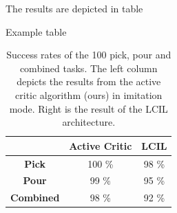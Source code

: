 The results are depicted in table

\begin{table}
    \centering
    \caption{Example table}
    \begin{tabular}{|c|c|c|}
        \cline{2-3}
        \multicolumn{1}{c|}{} & \textbf{Active Critic} & \textbf{LCIL} \\ \hline
        \textbf{Pick} & 100 \% & 98 \% \\ \hline
        \textbf{Pour} & 99 \% & 95 \% \\ \hline
        \textbf{Combined} & 98 \% & 92 \% \\ \hline
    \end{tabular}
    \caption{Success rates of the 100 pick, pour and combined tasks. The left column depicts the results from the active critic algorithm (ours) in 
    imitation mode. Right is the result of the LCIL architecture.}
\end{table}

